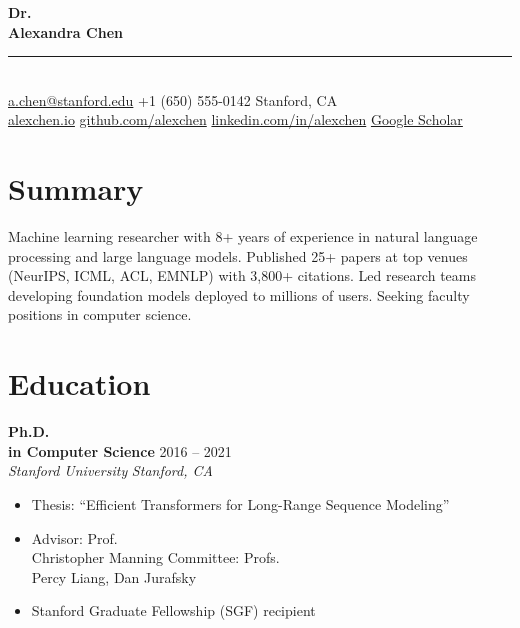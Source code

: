 \documentclass[11pt,a4paper]{article}
\newcommand{\cventry}[4]{%
  \textbf{#1} \hfill {\color{lightgray}#2}\\
  {\color{accent}\textit{#3}} \hfill {\color{lightgray}\textit{#4}}\\[2pt]
}
\begin{document}
\begin{center}
  {\fontsize{28}{34}\selectfont\bfseries\color{primary} Dr.\\ Alexandra Chen}\\[8pt]
  {\color{lightgray}\rule{8cm}{0.5pt}}\\[8pt]
  {\small
    \;\href{mailto:a.chen@stanford.edu}{a.chen@stanford.edu} \quad
    \;+1 (650) 555-0142 \quad
    \;Stanford, CA\\[4pt]
    \;\href{https://alexchen.io}{alexchen.io} \quad
    \;\href{https://github.com/alexchen}{github.com/alexchen} \quad
    \;\href{https://linkedin.com/in/alexchen}{linkedin.com/in/alexchen} \quad
    \;\href{https://scholar.google.com/citations?user=XXXXX}{Google Scholar}
  }
\end{center}

\vspace{4pt}

\section{Summary}

Machine learning researcher with 8+ years of experience in natural language processing and large language models. Published 25+ papers at top venues (NeurIPS, ICML, ACL, EMNLP) with 3,800+ citations. Led research teams developing foundation models deployed to millions of users. Seeking faculty positions in computer science.

\section{Education}

\cventry{Ph.D.\\ in Computer Science}{2016 -- 2021}{Stanford University}{Stanford, CA}
\begin{itemize}[leftmargin=1.5em, nosep, itemsep=2pt]
  \item Thesis: ``Efficient Transformers for Long-Range Sequence Modeling''
  \item Advisor: Prof.\\ Christopher Manning \quad Committee: Profs.\\ Percy Liang, Dan Jurafsky
  \item Stanford Graduate Fellowship (SGF) recipient
\end{itemize}
\end{document}
